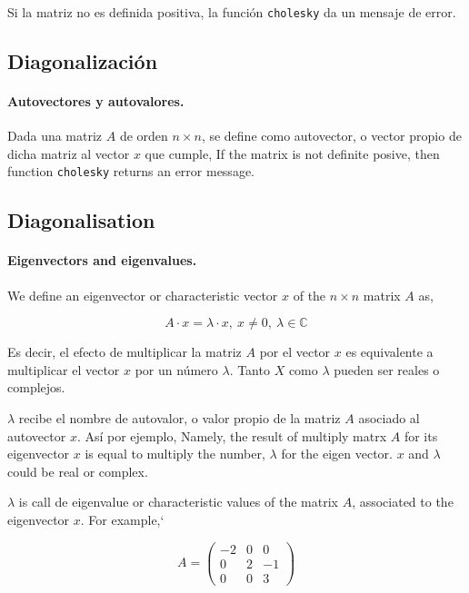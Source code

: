 \begin{paracol}{2}
Si la matriz no es definida positiva, la función \texttt{cholesky} da un mensaje de error.

\subsection{Diagonalización}\label{sec:diag}
\paragraph{Autovectores y autovalores.} Dada una matriz $A$ de orden $n\times n$, se define como autovector, o vector propio de dicha matriz al vector $x$ que cumple,
\switchcolumn
If the matrix is not definite posive, then function \texttt{cholesky} returns an error message.
\subsection{Diagonalisation}
\paragraph{Eigenvectors and eigenvalues.} We define an eigenvector or characteristic vector $x$ of the $n\times n$ matrix $A$ as, 
\end{paracol}
\begin{equation*}
A\cdot x =\lambda \cdot x, \  x\neq 0, \ \lambda \in \mathbb{C}
\end{equation*}
\begin{paracol}{2}
Es decir, el efecto de multiplicar la matriz $A$ por el vector $x$ es equivalente a multiplicar el vector $x$  por un número $\lambda$. Tanto $X$ como $\lambda$ pueden ser reales o complejos.

$\lambda$ recibe el nombre de autovalor, o valor propio de la matriz $A$ asociado al autovector $x$. Así por ejemplo,
\switchcolumn
Namely, the result of multiply matrx $A$ for its eigenvector $x$ is equal to multiply the number, $\lambda$ for the eigen vector. $x$ and $\lambda$ could be real or complex.

$\lambda$ is call de eigenvalue or characteristic values of the matrix $A$, associated to the eigenvector $x$. For example,`
\end{paracol}
\begin{equation*}
A= \begin{pmatrix}
-2& 0& 0\\
0& 2 & -1\\
0& 0& 3
\end{pmatrix}
\end{equation*}

